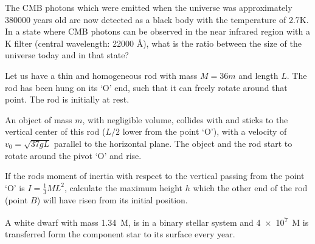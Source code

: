 \documentclass[11pt, a4paper]{exam}
\begin{document}
\begin{questions}
		
		\question
		The CMB photons which were emitted when the universe was approximately 380000 years old are now detected as a black body with the temperature of 2.7K. In a state where CMB photons can be observed in the near infrared region with a K filter (central wavelength: 22000 \AA), what is the ratio between the size of the universe today and in that state?
		
		\question
		Let us have a thin and homogeneous rod with mass $M = 36m$ and length $L$. The rod has been hung on its `O' end, such that it can freely rotate around that point. The rod is initially at rest.
		
		An object of mass $m$, with negligible volume, collides with and sticks to the vertical center of this rod ($L/2$ lower from the point `O'), with a velocity of $v_0 = \sqrt{37gL}$ parallel to the horizontal plane. The object and the rod start to rotate around the pivot `O' and rise.
		
		If the rods moment of inertia with respect to the vertical passing from the point `O' is $I = \frac{1}{3}ML^2$, calculate the maximum height $h$ which the other end of the rod (point $B$) will have risen from its initial position.
		
		\question
		A white dwarf with mass \SI{1.34}{M_\odot}, is in a binary stellar system and \SI{4e7}{M_\odot} is transferred form the component star to its  surface every year.
\end{questions}
\end{document}
